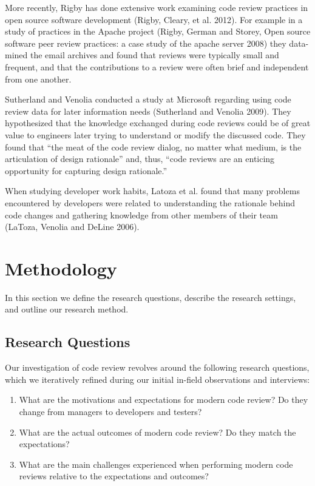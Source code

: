 \documentclass[conference]{IEEEtran}
\begin{document}
More recently, Rigby has done extensive work examining code review practices in
open source software development (Rigby, Cleary, et al. 2012).  For example in
a study of practices in the Apache project (Rigby, German and Storey, Open
source software peer review practices: a case study of the apache server 2008)
they data-mined the email archives and found that reviews were typically small
and frequent, and that the contributions to a review were often brief and
independent from one another.

Sutherland and Venolia conducted a study at Microsoft regarding using code
review data for later information needs (Sutherland and Venolia 2009). They
hypothesized that the knowledge exchanged during code reviews could be of great
value to engineers later trying to understand or modify the discussed code.
They found that ``the meat of the code review dialog, no matter what medium, is
the articulation of design rationale'' and, thus, ``code reviews are an enticing
opportunity for capturing design rationale.''

When studying developer work habits, Latoza et al. found that many problems
encountered by developers were related to understanding the rationale behind
code changes and gathering knowledge from other members of their team (LaToza,
Venolia and DeLine 2006).

\section{Methodology}

In this section we define the research questions, describe the research
settings, and outline our research method.

\subsection{Research Questions}

Our investigation of code review revolves around the following research
questions, which we iteratively refined during our initial in-field
observations and interviews:

\begin{enumerate}
  \item What are the motivations and expectations for modern code review? Do they change from managers to developers and testers?
  \item What are the actual outcomes of modern code review? Do they match the expectations?
  \item What are the main challenges experienced when performing modern code reviews relative to the expectations and outcomes?
\end{enumerate}
\end{document}
